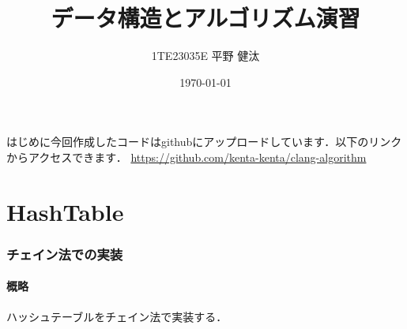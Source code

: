 \documentclass{ltjsarticle}
\begin{document}
\title{データ構造とアルゴリズム演習}
\author{1TE23035E 平野 健汰}
\date{\today}

\maketitle

はじめに今回作成したコードはgithubにアップロードしています．以下のリンクからアクセスできます．
\url{https://github.com/kenta-kenta/clang-algorithm}

\part{HashTable}

\section{チェイン法での実装}
\subsection{概略}
ハッシュテーブルをチェイン法で実装する．
\end{document}
